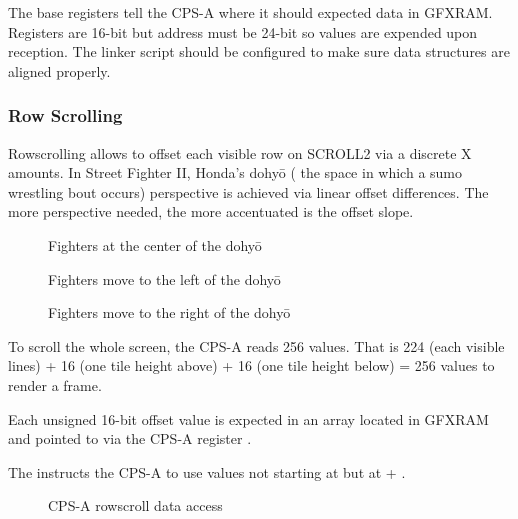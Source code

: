 The base registers tell the CPS-A where it should expected data in GFXRAM. Registers are 16-bit but address must be 24-bit so values are expended  upon reception. The linker script should be configured to make sure data structures are aligned properly.

\subsubsection{Row Scrolling}
Rowscrolling allows to offset each visible row on SCROLL2 via a discrete X amounts. In Street Fighter II, Honda's dohyō ( the space in which a sumo wrestling bout occurs) perspective is achieved via linear offset differences. The more perspective needed, the more accentuated is the offset slope. 

\begin{figure}[H]
\caption*{Fighters at the center of the dohyō}
 \end{figure}%

\begin{figure}[H]
\caption*{Fighters move to the left of the dohyō}
 \end{figure}%

\begin{figure}[H]
\caption*{Fighters move to the right of the dohyō}
 \end{figure}%

To scroll the whole screen, the CPS-A reads 256 values. That is 224 (each visible lines) + 16 (one tile height above) + 16 (one tile height below) = 256 values to render a frame.

Each unsigned 16-bit offset value is expected in an array located in GFXRAM and pointed to via the CPS-A register .

The  instructs the CPS-A to use values not starting at  but at  + . 

\begin{figure}[H]
 \caption*{CPS-A rowscroll data access}%
 \end{figure}%



